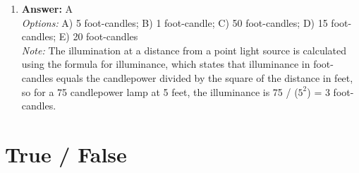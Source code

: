 \documentclass[12pt]{article}
\begin{document}
\begin{enumerate}[label=\arabic*.]
\item \textbf{Answer:} A
\\ \textit{Options:} A) 5 foot-candles; B) 1 foot-candle; C) 50 foot-candles; D) 15 foot-candles; E) 20 foot-candles
\\ \textit{Note:} The illumination at a distance from a point light source is calculated using the formula for illuminance, which states that illuminance in foot-candles equals the candlepower divided by the square of the distance in feet, so for a 75 candlepower lamp at 5 feet, the illuminance is 75 / ($5^2$) = 3 foot-candles.
\end{enumerate}

\section*{True / False}
\end{document}
